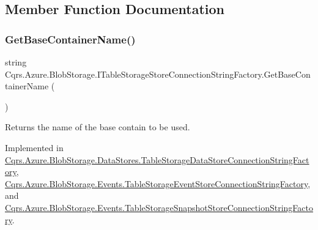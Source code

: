 \subsection{Member Function Documentation}
\mbox{\label{interfaceCqrs_1_1Azure_1_1BlobStorage_1_1ITableStorageStoreConnectionStringFactory_a1b9bfc9dcb7292e62619fc46e4a85982_a1b9bfc9dcb7292e62619fc46e4a85982}} 
\subsubsection{\texorpdfstring{Get\+Base\+Container\+Name()}{GetBaseContainerName()}}
{\footnotesize\ttfamily string Cqrs.\+Azure.\+Blob\+Storage.\+I\+Table\+Storage\+Store\+Connection\+String\+Factory.\+Get\+Base\+Container\+Name (\begin{DoxyParamCaption}{ }\end{DoxyParamCaption})}



Returns the name of the base contain to be used. 



Implemented in \hyperlink{classCqrs_1_1Azure_1_1BlobStorage_1_1DataStores_1_1TableStorageDataStoreConnectionStringFactory_a03239d850e3fd95cd1507780425a7c94_a03239d850e3fd95cd1507780425a7c94}{Cqrs.\+Azure.\+Blob\+Storage.\+Data\+Stores.\+Table\+Storage\+Data\+Store\+Connection\+String\+Factory}, \hyperlink{classCqrs_1_1Azure_1_1BlobStorage_1_1Events_1_1TableStorageEventStoreConnectionStringFactory_a118388598a7fa653122fc11521c915d7_a118388598a7fa653122fc11521c915d7}{Cqrs.\+Azure.\+Blob\+Storage.\+Events.\+Table\+Storage\+Event\+Store\+Connection\+String\+Factory}, and \hyperlink{classCqrs_1_1Azure_1_1BlobStorage_1_1Events_1_1TableStorageSnapshotStoreConnectionStringFactory_af0ddf382c977759aa45d3971fb21cbed_af0ddf382c977759aa45d3971fb21cbed}{Cqrs.\+Azure.\+Blob\+Storage.\+Events.\+Table\+Storage\+Snapshot\+Store\+Connection\+String\+Factory}.

